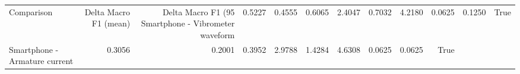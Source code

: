 \begin{tabular}{lrrrrrrrrr}
\toprule
Comparison & Delta Macro F1 (mean) & Delta Macro F1 (95%
\midrule
Smartphone - Vibrometer waveform & 0.5227 & 0.4555 & 0.6065 & 2.4047 & 0.7032 & 4.2180 & 0.0625 & 0.1250 & True \\
Smartphone - Armature current & 0.3056 & 0.2001 & 0.3952 & 2.9788 & 1.4284 & 4.6308 & 0.0625 & 0.0625 & True \\
\bottomrule
\end{tabular}
